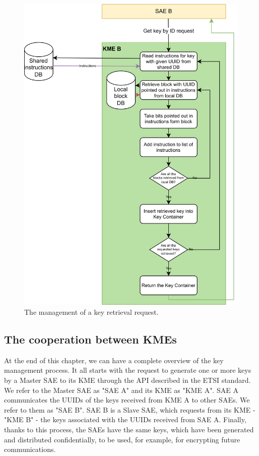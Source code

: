 \begin{figure}[H]
    \centering
    \includegraphics{Images/key_retrieval.png}
    \caption{The management of a key retrieval request.}
    \label{fig:key_retrieval}
\end{figure}

\subsection{The cooperation between KMEs}
At the end of this chapter, we can have a complete overview of the key management process.
It all starts with the request to generate one or more keys by a Master SAE to its KME through the API described in the ETSI standard. We refer to the Master SAE as "SAE A" and its KME as "KME A".
SAE A communicates the UUIDs of the keys received from KME A to other SAEs. We refer to them as "SAE B". SAE B is a Slave SAE, which requests from its KME - "KME B" - the keys associated with the UUIDs received from SAE A.
Finally, thanks to this process, the SAEs have the same keys, which have been generated and distributed confidentially, to be used, for example, for encrypting future communications.

